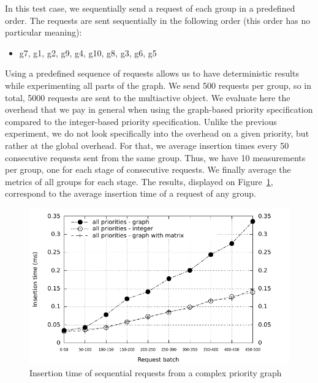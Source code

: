 \documentclass[11pt]{report}
\begin{document}
In this test case, we sequentially send a request of each group in a predefined order. The requests are sent sequentially in the following order (this order has no particular meaning):
\begin{itemize}
\item g7, g1, g2, g9, g4, g10, g8, g3, g6, g5
\end{itemize}
Using a predefined sequence of requests allows us to have deterministic results while experimenting all parts of the graph. We send 500 requests per group, so in total, 5000 requests are sent to the multiactive object. 
We evaluate here the overhead that we pay in general when using the graph-based priority specification compared to the integer-based priority specification. Unlike the previous experiment, we do not look specifically into the overhead on a given priority, but rather at the global overhead. For that, we average insertion times every 50 consecutive requests sent from the same group. Thus, we have 10 measurements per group, one for each stage of consecutive requests. We finally average the metrics of all groups for each stage. The results, displayed on Figure~\ref{fig:sequential}, correspond to the average insertion time of a request of any group.

\begin{figure}[!ht]
      \begin{minipage}[c]{\textwidth}
      \centering
      \includegraphics[scale=1]{pictures/sequential.pdf}
      \end{minipage}
      \caption{Insertion time of sequential requests from a complex priority graph}
      \label{fig:sequential} 
\end{figure}
\end{document}

